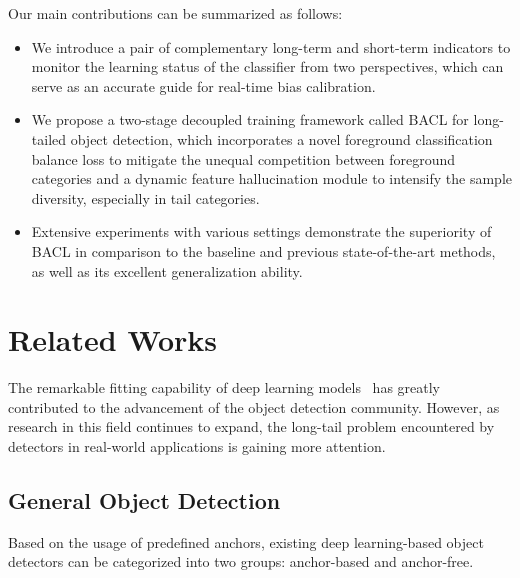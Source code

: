 \documentclass[lettersize,journal]{IEEEtran}
\begin{document}
Our main contributions can be summarized as follows:
\begin{itemize}
    \item We introduce a pair of complementary long-term and short-term indicators to monitor the learning status of the classifier from two perspectives, which can serve as an accurate guide for real-time bias calibration.
    \item We propose a two-stage decoupled training framework called BACL for long-tailed object detection, which incorporates a novel foreground classification balance loss to mitigate the unequal competition between foreground categories and a dynamic feature hallucination module to intensify the sample diversity, especially in tail categories.
    \item Extensive experiments with various settings demonstrate the superiority of BACL in comparison to the baseline and previous state-of-the-art methods, as well as its excellent generalization ability.
\end{itemize}


\section{Related Works}

The remarkable fitting capability of deep learning models~\cite{liu2022fine,li2022neighborhood,yao2018exploring}  has greatly contributed to the advancement of the object detection community.
However, as research in this field continues to expand, the long-tail problem encountered by detectors in real-world applications is gaining more attention.


\subsection{General Object Detection}
Based on the usage of predefined anchors, existing deep learning-based object detectors can be categorized into two groups: anchor-based and anchor-free.
\end{document}
